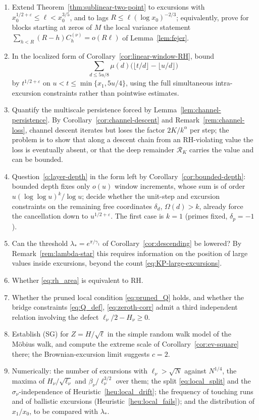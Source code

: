 \documentclass[11pt]{amsart}
\numberwithin{equation}{section}
\theoremstyle{plain}
\theoremstyle{definition}
\theoremstyle{remark}
\newcommand{\eps}{\varepsilon}
\begin{document}
\begin{enumerate}[label=\textup{(\arabic*)}]
\item Extend Theorem~\ref{thm:sublinear-two-point} to excursions with
$x_0^{1/2+\eps}\le\ell<x_0^{3/5}$, and to lags $R\le\ell(\log x_0)^{-2/3}$;
equivalently, prove for blocks starting at zeros of $M$ the local variance
statement $\sum_{h<R}(R-h)C^{(\nu)}_h=o(R\ell)$ of Lemma~\ref{lem:fejer}.
\item In the localized form of Corollary~\ref{cor:linear-window-RH}, bound
\[
\sum_{d\le5u/8}\mu(d)
\bigl(\lfloor t/d\rfloor-\lfloor u/d\rfloor\bigr)
\]
by $t^{1/2+\eps}$ on
$u<t\le\min\{x_1,5u/4\}$, using the full simultaneous intra-excursion
constraints rather than pointwise estimates.
\item Quantify the multiscale persistence forced by
Lemma~\ref{lem:channel-persistence}.  By Corollary~\ref{cor:channel-descent}
and Remark~\ref{rem:channel-loss}, channel descent iterates but loses the
factor $2K/k^\alpha$ per step; the problem is to show that along a descent
chain from an RH-violating value the loss is eventually absent, or that the
deep remainder $\mathcal R_K$ carries the value and can be bounded.
\item Question~\ref{q:layer-depth} in the form left by
Corollary~\ref{cor:bounded-depth}: bounded depth fixes only $o(u)$ window
increments, whose sum is of order $u(\log\log u)^k/\log u$; decide whether
the unit-step and excursion constraints on the remaining free coordinates
$\delta_d$, $\Omega(d)>k$, already force the cancellation down to
$u^{1/2+\eps}$. The first case is $k=1$ (primes fixed, $\delta_p=-1$).
\item Can the threshold $\lambda_*=e^{\pi/\gamma_1}$ of
Corollary~\ref{cor:descending} be lowered? By
Remark~\ref{rem:lambda-star} this requires information on the position of
large values inside excursions, beyond the count
\eqref{eq:KP-large-excursions}.
\item Whether \eqref{eq:rh_area} is equivalent to RH.
\item Whether the pruned local condition \eqref{eq:pruned_Q} holds, and
whether the bridge constraints \eqref{eq:Q_def}, \eqref{eq:zeroth-corr}
admit a third independent relation involving the defect
$\ell_\nu/2-H_\nu\ge0$.
\item Establish (SG) for $Z=H/\sqrt\ell$ in the simple random walk model of
the M\"obius walk, and compute the extreme scale of
Corollary~\ref{cor:ev-square} there; the Brownian-excursion limit suggests
$c=2$.
\item Numerically: the number of excursions with $\ell_\nu>\sqrt N$ against
$N^{1/4}$, the maxima of $H_\nu/\sqrt{\ell_\nu}$ and $\beta_\nu/\ell_\nu^{3/2}$
over them; the split \eqref{eq:local_split} and the $\sigma_\nu$-independence
of Heuristic~\ref{heu:local_drift}; the frequency of touching runs and of
ballistic excursions (Heuristic~\ref{heu:local_fails}); and the distribution
of $x_1/x_0$, to be compared with $\lambda_*$.
\end{enumerate}
\end{document}
